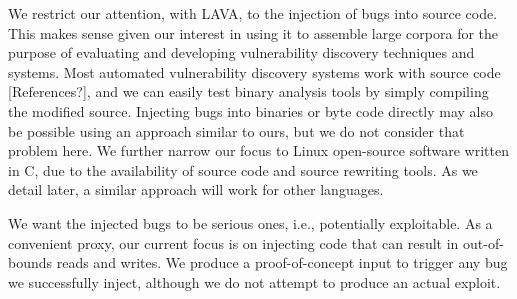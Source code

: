 
We restrict our attention, with LAVA, to the injection of bugs into source code.
This makes sense given our interest in using it to assemble large corpora for the purpose of evaluating and developing vulnerability discovery techniques and systems.
Most automated vulnerability discovery systems work with source code [References?], and we can easily test binary analysis tools by simply compiling the modified source.
Injecting bugs into binaries or byte code directly may also be possible using an approach similar to ours, but we do not consider that problem here.
We further narrow our focus to Linux open-source software written in C, due to the availability of source code and source rewriting tools.
As we detail later, a similar approach will work for other languages.

We want the injected bugs to be serious ones, i.e., potentially exploitable.
As a convenient proxy, our current focus is on injecting code that can result in out-of-bounds reads and writes.  
We produce a proof-of-concept input to trigger any bug we successfully inject, although we do not attempt to produce an actual exploit.
